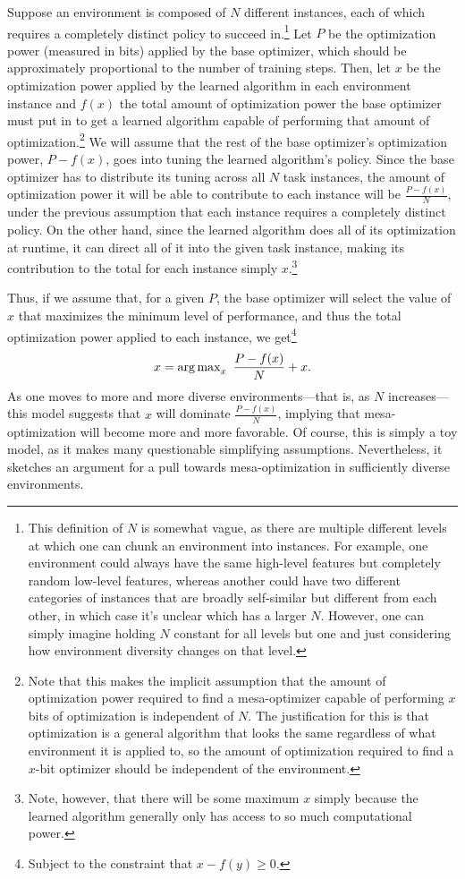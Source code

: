 \documentclass[
  onecolumn,
  natbib,
]{miri-tech-article}
\begin{document}
Suppose an environment is composed of $N$ different instances, each of which requires a completely distinct policy to succeed in.\footnote{This definition of $N$ is somewhat vague, as there are multiple different levels at which one can chunk an environment into instances. For example, one environment could always have the same high-level features but completely random low-level features, whereas another could have two different categories of instances that are broadly self-similar but different from each other, in which case it's unclear which has a larger $N$. However, one can simply imagine holding $N$ constant for all levels but one and just considering how environment diversity changes on that level.} Let $P$ be the optimization power (measured in bits\cite{optpow}) applied by the base optimizer, which should be approximately proportional to the number of training steps. Then, let $x$ be the optimization power applied by the learned algorithm in each environment instance and $f(x)$ the total amount of optimization power the base optimizer must put in to get a learned algorithm capable of performing that amount of optimization.\footnote{Note that this makes the implicit assumption that the amount of optimization power required to find a mesa-optimizer capable of performing $x$ bits of optimization is independent of $N$. The justification for this is that optimization is a general algorithm that looks the same regardless of what environment it is applied to, so the amount of optimization required to find a $x$-bit optimizer should be independent of the environment.} We will assume that the rest of the base optimizer's optimization power, $P - f(x)$, goes into tuning the learned algorithm's policy. Since the base optimizer has to distribute its tuning across all $N$ task instances, the amount of optimization power it will be able to contribute to each instance will be $\frac{P - f(x)}{N}$, under the previous assumption that each instance requires a completely distinct policy. On the other hand, since the learned algorithm does all of its optimization at runtime, it can direct all of it into the given task instance, making its contribution to the total for each instance simply $x$.\footnote{Note, however, that there will be some maximum $x$ simply because the learned algorithm generally only has access to so much computational power.}

Thus, if we assume that, for a given $P$, the base optimizer will select the value of $x$ that maximizes the minimum level of performance, and thus the total optimization power applied to each instance, we get\footnote{Subject to the constraint that $x - f(y) \ge 0$.}
\[
  x = \operatorname{arg\,max}_x~ \frac{P - f(x)}{N} + x.
\]
As one moves to more and more diverse environments---that is, as $N$ increases---this model suggests that $x$ will dominate $\frac{P - f(x)}{N}$, implying that mesa-optimization will become more and more favorable. Of course, this is simply a toy model, as it makes many questionable simplifying assumptions. Nevertheless, it sketches an argument for a pull towards mesa-optimization in sufficiently diverse environments.
\end{document}
